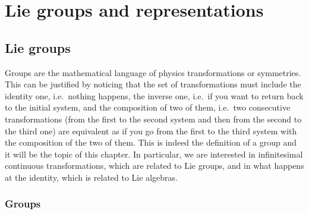 \part{Lie groups and representations}

\chapter{Lie groups}

    Groups are the mathematical language of physics transformations or symmetries. This can be justified by noticing that the set of transformations must include the identity one, i.e.~nothing happens, the inverse one, i.e.~if you want to return back to the initial system, and the composition of two of them, i.e.~two consecutive transformations (from the first to the second system and then from the second to the third one) are equivalent as if you go from the first to the third system with the composition of the two of them. This is indeed the definition of a group and it will be the topic of this chapter. In particular, we are interested in infinitesimal continuous transformations, which are related to Lie groups, and in what happens at the identity, which is related to Lie algebras.

\section{Groups}

